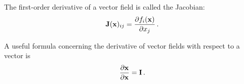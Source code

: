     The first-order derivative of a vector field is called the Jacobian:
    \begin{equation}
        \vb{J}(\vb{x})_{ij} = \pdv{f_i(\vb{x})}{x_j} \thinspace .
    \end{equation}

    A useful formula concerning the derivative of vector fields with respect to a vector is
    \begin{align}
        \pdv{\vb{x}}{\vb{x}} = \vb{I} \thinspace .
    \end{align}
